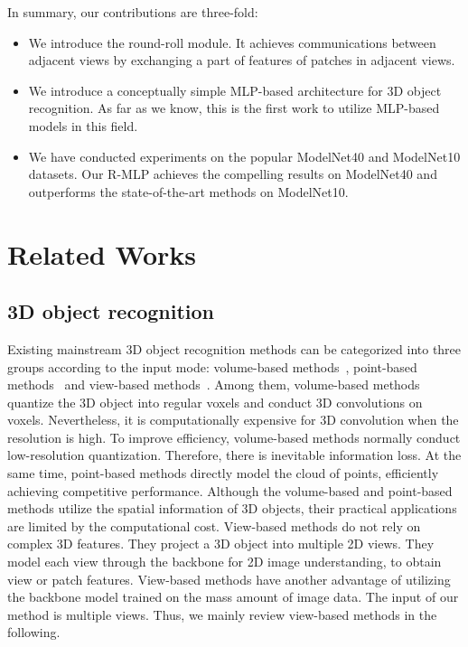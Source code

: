 \documentclass[11pt]{article}
\begin{document}
\newpage

In summary, our contributions are three-fold:
\begin{itemize}
    \item We introduce the round-roll module. It achieves communications between adjacent views by exchanging a part of features of patches in adjacent views.
     \item We introduce a conceptually simple MLP-based architecture for 3D object recognition. As far as we know, this is the first work to utilize MLP-based models in this field.
    \item We have conducted experiments on the popular ModelNet40 and ModelNet10 datasets. Our R-MLP achieves the compelling results on ModelNet40  and outperforms the state-of-the-art methods on ModelNet10.
\end{itemize}



\section{Related Works}
\subsection{3D object recognition}
Existing mainstream 3D object recognition methods can be categorized into three groups according to the input mode:
volume-based methods~\citep{wu20153d,qi2016volumetric},
point-based methods~\citep{qi2017pointnet,qi2017pointnet++}
and view-based methods~\citep{wang2017dominant,feng2018gvcnn,kanezaki2018rotationnet,han2019seqview2seqlabels,han20193d2seqvies,wei2020view}.
Among them, volume-based methods quantize the 3D object into regular voxels and conduct  3D convolutions on voxels. Nevertheless, it is computationally expensive for 3D convolution when the resolution is high. To improve  efficiency,  volume-based methods  normally conduct low-resolution quantization. Therefore, there is inevitable information loss. At the same time, point-based methods directly model the cloud of points, efficiently achieving competitive performance. Although the volume-based and point-based methods utilize the spatial information of 3D objects, their practical applications are limited by the computational cost. View-based methods do not rely on complex 3D features. They project a 3D object into multiple 2D views. They model each view through the backbone for 2D image understanding, to obtain view  or patch features. View-based methods have another advantage of utilizing the backbone model trained on the mass amount of image data. The input of our method is multiple views. Thus, we mainly review view-based methods in the following.
\end{document}
